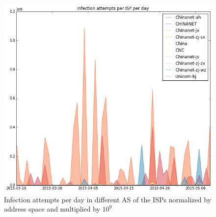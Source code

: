 \begin{figure}[h]
     \caption{Infection attempts per day in different AS of the ISPs normalized by address space and multiplied by $10^9$}
     \label{fig:isp_legend_area}
    \centering
    \includegraphics[width=\linewidth]{images/isp_legend_area_norm}
\end{figure}

